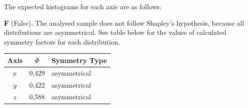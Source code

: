 \begin{description}
  The expected histograms for each axis are as follows:
\item[(d)] \textbf{F} (False). The analysed sample does not follow Shapley's
  hypothesis, because all distributions are asymmetrical. See table below for
  the values of calculated symmetry factors for each distribution.

  \begin{center}
  \begin{tabular}{|c|c|l|}
  \hline
  \textbf{Axis} & $\Phi$ & \textbf{Symmetry Type}\\
  \hline
  $x$ & 0,429 & asymmetrical\\   $y$ & 0,422 & asymmetrical\\
  $z$ & 0,588 & asymmetrical\\
  \hline
  \end{tabular}
  \end{center}
\end{description}
